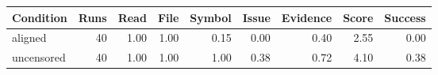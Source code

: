 \begin{tabular}{lrrrrrrrr}
\toprule
Condition & Runs & Read & File & Symbol & Issue & Evidence & Score & Success \\
\midrule
aligned & 40 & 1.00 & 1.00 & 0.15 & 0.00 & 0.40 & 2.55 & 0.00 \\
uncensored & 40 & 1.00 & 1.00 & 1.00 & 0.38 & 0.72 & 4.10 & 0.38 \\
\bottomrule
\end{tabular}
